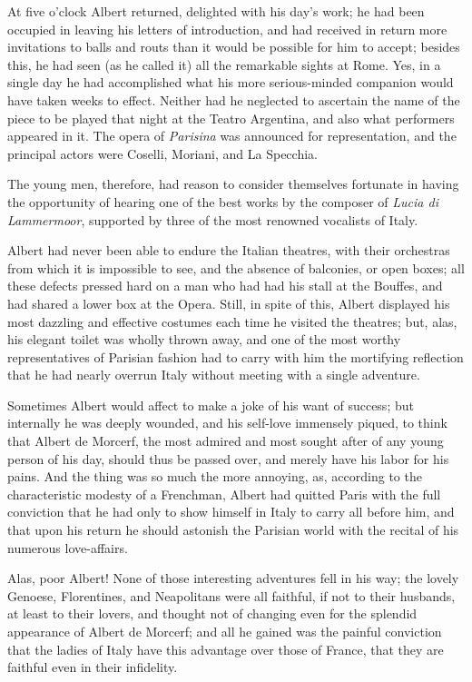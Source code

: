 At five o’clock Albert returned, delighted with his day’s work; he had
been occupied in leaving his letters of introduction, and had received
in return more invitations to balls and routs than it would be possible
for him to accept; besides this, he had seen (as he called it) all the
remarkable sights at Rome. Yes, in a single day he had accomplished
what his more serious-minded companion would have taken weeks to
effect. Neither had he neglected to ascertain the name of the piece to
be played that night at the Teatro Argentina, and also what performers
appeared in it. The opera of \textit{Parisina} was announced for
representation, and the principal actors were Coselli, Moriani, and La
Specchia.

The young men, therefore, had reason to consider themselves fortunate
in having the opportunity of hearing one of the best works by the
composer of \textit{Lucia di Lammermoor}, supported by three of the most
renowned vocalists of Italy.

Albert had never been able to endure the Italian theatres, with their
orchestras from which it is impossible to see, and the absence of
balconies, or open boxes; all these defects pressed hard on a man who
had had his stall at the Bouffes, and had shared a lower box at the
Opera. Still, in spite of this, Albert displayed his most dazzling and
effective costumes each time he visited the theatres; but, alas, his
elegant toilet was wholly thrown away, and one of the most worthy
representatives of Parisian fashion had to carry with him the
mortifying reflection that he had nearly overrun Italy without meeting
with a single adventure.

Sometimes Albert would affect to make a joke of his want of success;
but internally he was deeply wounded, and his self-love immensely
piqued, to think that Albert de Morcerf, the most admired and most
sought after of any young person of his day, should thus be passed
over, and merely have his labor for his pains. And the thing was so
much the more annoying, as, according to the characteristic modesty of
a Frenchman, Albert had quitted Paris with the full conviction that he
had only to show himself in Italy to carry all before him, and that
upon his return he should astonish the Parisian world with the recital
of his numerous love-affairs.

Alas, poor Albert! None of those interesting adventures fell in his
way; the lovely Genoese, Florentines, and Neapolitans were all
faithful, if not to their husbands, at least to their lovers, and
thought not of changing even for the splendid appearance of Albert de
Morcerf; and all he gained was the painful conviction that the ladies
of Italy have this advantage over those of France, that they are
faithful even in their infidelity.


